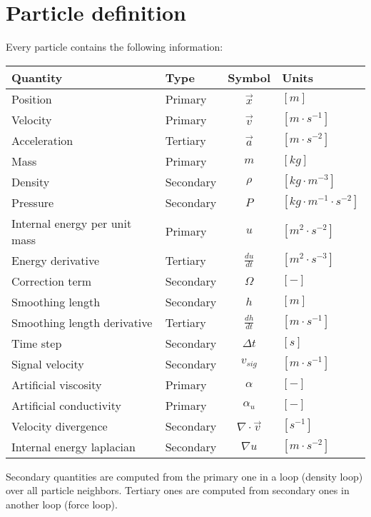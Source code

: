 \documentclass[a4paper,10pt]{report}
\begin{document}
\section{Particle definition}
Every particle contains the following information:

\begin{table}[h]
\centering
\begin{tabular}{|l|l|c|l|}
 \hline
 \textbf{Quantity} & \textbf{Type} & \textbf{Symbol} & \textbf{Units} \\
 \hline \hline
 Position & Primary & $\vec{x}$ & $[m]$ \\
 Velocity & Primary &$\vec{v}$ & $[m\cdot s^{-1}]$ \\
 Acceleration & Tertiary &$\vec{a}$ & $[m\cdot s^{-2}]$ \\
 Mass & Primary &$m$ & $[kg]$ \\
 Density & Secondary & $\rho$ & $[kg\cdot m^{-3}]$ \\
 Pressure & Secondary & $P$ & $[kg \cdot m^{-1}\cdot s^{-2}]$ \\
 Internal energy per unit mass & Primary & $u$ & $[m^2 \cdot s^{-2}]$ \\ 
 Energy derivative & Tertiary & $\frac{du}{dt}$ & $[ m^2 \cdot s^{-3}]$ \\
 Correction term & Secondary & $\Omega$ & $[-]$ \\
 Smoothing length & Secondary &$h$ & $[m]$ \\
 Smoothing length derivative & Tertiary &$\frac{dh}{dt}$ & $[m\cdot s^{-1}]$ \\
 Time step & Secondary & $\Delta t$ & $[s]$ \\
 Signal velocity & Secondary & $v_{sig}$& $[m\cdot s^{-1}]$ \\
\hline
 Artificial viscosity & Primary & $\alpha$ & $[-]$\\
 Artificial conductivity & Primary & $\alpha_u$ & $[-]$\\
 Velocity divergence & Secondary & $\nabla\cdot \vec{v}$ & $[s^{-1}]$ \\
 Internal energy laplacian & Secondary & $\nabla u$ & $[m\cdot s^{-2}]$\\
\hline
\end{tabular} 
\end{table}

Secondary quantities are computed from the primary one in a loop (density loop) over all particle neighbors. Tertiary
ones are computed from secondary ones in another loop (force loop). \\
\end{document}

